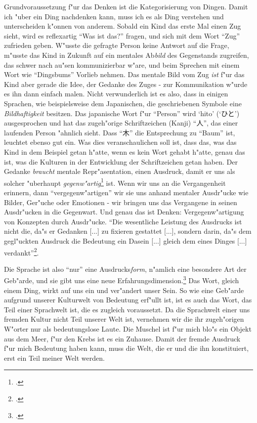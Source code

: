\documentclass[a4paper, 12pt]{article}
\begin{document}
\begin{onehalfspace}
Grundvoraussetzung f"ur das Denken ist die Kategorisierung von Dingen. Damit ich "uber ein Ding nachdenken kann, muss ich es als Ding verstehen und unterscheiden k"onnen von anderem. Sobald ein Kind das erste Mal einen Zug sieht, wird es reflexartig "`Was ist das?"' fragen, und sich mit dem Wort "`Zug"' zufrieden geben. W"usste die gefragte Person keine Antwort auf die Frage, m"usste das Kind in Zukunft auf ein mentales Ab\emph{bild} des Gegenstands zugreifen, das schwer nach au"sen kommunizierbar w"are, und beim Sprechen mit einem Wort wie "`Dingsbums"' Vorlieb nehmen. Das mentale Bild vom Zug \emph{ist} f"ur das Kind aber gerade die Idee, der Gedanke des Zuges - zur Kommunikation w"urde es ihn dann einfach malen. Nicht verwunderlich ist es also, dass in einigen Sprachen, wie beispielsweise dem Japanischen, die geschriebenen Symbole eine \emph{Bildhaftigkeit} besitzen. Das japanische Wort f"ur "`Person"' wird `hito' (`ひと') ausgesprochen und hat das zugeh"orige Schriftzeichen (Kanji) "`人"', das einer laufenden Person "ahnlich sieht. Dass "`木"' die Entsprechung zu "`Baum"' ist, leuchtet ebenso gut ein. Was dies veranschaulichen soll ist, dass das, was das Kind in dem Beispiel getan h"atte, wenn es kein Wort gehabt h"atte, genau das ist, was die Kulturen in der Entwicklung der Schriftzeichen getan haben. Der Gedanke \emph{braucht} mentale Repr"asentation, einen Ausdruck, damit er uns als solcher "uberhaupt \emph{gegenw"artig}\footnote{\cite[Vgl.][S. 215 f.]{merleau1966phanomenologie}.} ist. Wenn wir uns an die Vergangenheit erinnern, dann "`vergegenw"artigen"' wir sie uns anhand mentaler Ausdr"ucke wie Bilder, Ger"uche oder Emotionen - wir bringen uns das Vergangene in seinen Ausdr"ucken in die Gegenwart. Und genau das ist Denken: Vergegenw"artigung von Konzepten durch Ausdr"ucke. "`Die wesentliche Leistung des Ausdrucks ist nicht die, da"s er Gedanken [...] zu fixieren gestattet [...], sondern darin, da"s dem gegl"uckten Ausdruck die Bedeutung ein Dasein [...] gleich dem eines Dinges [...] verdankt"'\footnote{\cite[S. 216]{merleau1966phanomenologie}.}. 

Die Sprache ist also "`nur"' eine Ausdrucks\emph{form}, n"amlich eine besondere Art der Geb"arde, und sie gibt uns eine neue Erfahrungsdimension.\footnote{\cite[Vgl.][S. 216 f.]{merleau1966phanomenologie}.} Das Wort, gleich einem Ding, wirkt auf uns ein und ver"andert unser Sein. So wie eine Geb"arde aufgrund unserer Kulturwelt von Bedeutung erf"ullt ist, ist es auch das Wort, das Teil einer Sprachwelt ist, die es zugleich voraussetzt. Da die Sprachwelt einer uns fremden Kultur nicht Teil unserer Welt ist, vernehmen wir die ihr zugeh"origen W"orter nur als bedeutungslose Laute. Die Muschel ist f"ur mich blo"s ein Objekt aus dem Meer, f"ur den Krebs ist es ein Zuhause. Damit der fremde Ausdruck f"ur mich Bedeutung haben kann, muss die Welt, die er und die ihn konstituiert, erst ein Teil meiner Welt werden. 


\end{onehalfspace}
\end{document}
